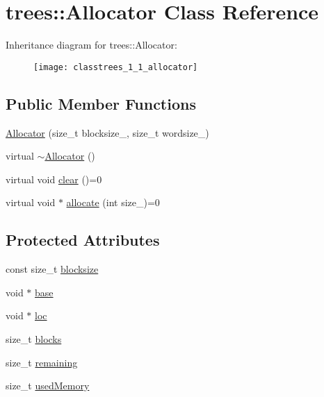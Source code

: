 \hypertarget{classtrees_1_1_allocator}{}\section{trees\+:\+:Allocator Class Reference}
\label{classtrees_1_1_allocator}
Inheritance diagram for trees\+:\+:Allocator\+:\begin{figure}[H]
\begin{center}
\leavevmode
\texttt{[image: classtrees\_1\_1\_allocator]}
\end{center}
\end{figure}
\subsection*{Public Member Functions}
\begin{DoxyCompactItemize}
\item 
\hyperlink{classtrees_1_1_allocator_a1b08d5c6bc8ac6f20f077730a1e72f0e}{Allocator} (size\+\_\+t blocksize\+\_, size\+\_\+t wordsize\+\_)
\item 
virtual \hyperlink{classtrees_1_1_allocator_a9ccbc0afff4f296570718372c5848430}{$\sim$\+Allocator} ()
\item 
virtual void \hyperlink{classtrees_1_1_allocator_aa1188b27061817113bc4a3e4523868e0}{clear} ()=0
\item 
virtual void $\ast$ \hyperlink{classtrees_1_1_allocator_a3963a4c0384e3a83fd258a7d6b5303b9}{allocate} (int size\+\_\+)=0
\end{DoxyCompactItemize}
\subsection*{Protected Attributes}
\begin{DoxyCompactItemize}
\item 
const size\+\_\+t \hyperlink{classtrees_1_1_allocator_a7bfdc724139d5c16e4a466f2f095688b}{blocksize}
\item 
void $\ast$ \hyperlink{classtrees_1_1_allocator_a9cd94b47f93ea913811291ce8a3071a1}{base}
\item 
void $\ast$ \hyperlink{classtrees_1_1_allocator_a150ef8b53806d3cb02c97170aea46787}{loc}
\item 
size\+\_\+t \hyperlink{classtrees_1_1_allocator_af001a78f23465767f604441760ac9a69}{blocks}
\item 
size\+\_\+t \hyperlink{classtrees_1_1_allocator_a4db6c8c7b9ee3674503b1fb62b7e6b40}{remaining}
\item 
size\+\_\+t \hyperlink{classtrees_1_1_allocator_a9a6f444512dd3e66121a821e114207dd}{used\+Memory}
\end{DoxyCompactItemize}


